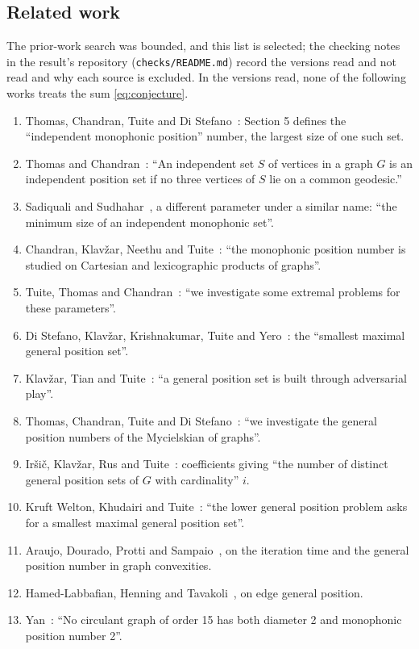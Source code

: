 \documentclass[11pt]{article}
\theoremstyle{remark}
\begin{document}
\begin{appendices}
\section{Related work}\label{app:prior}
The prior-work search was bounded, and this list is selected; the
checking notes in the result's repository (\texttt{checks/README.md})
record the versions read and not read and why each source is excluded.
In the versions read, none of the following works treats the sum
\eqref{eq:conjecture}.

\begin{enumerate}\setlength{\itemsep}{2pt}
\item Thomas, Chandran, Tuite and Di Stefano~\cite{monophonic}: Section 5
defines the ``independent monophonic position'' number, the largest size
of one such set.
\item Thomas and Chandran~\cite{independent}: ``An independent set $S$ of
vertices in a graph $G$ is an independent position set if no three
vertices of $S$ lie on a common geodesic.''
\item Sadiquali and Sudhahar~\cite{sadiquali}, a different parameter
under a similar name: ``the minimum size of an independent monophonic
set''.
\item Chandran, Klav\v{z}ar, Neethu and Tuite~\cite{products}: ``the
monophonic position number is studied on Cartesian and lexicographic
products of graphs''.
\item Tuite, Thomas and Chandran~\cite{extremal}: ``we investigate some
extremal problems for these parameters''.
\item Di Stefano, Klav\v{z}ar, Krishnakumar, Tuite and
Yero~\cite{lower}: the ``smallest maximal general position set''.
\item Klav\v{z}ar, Tian and Tuite~\cite{builder}: ``a general position
set is built through adversarial play''.
\item Thomas, Chandran, Tuite and Di Stefano~\cite{mycielski}: ``we
investigate the general position numbers of the Mycielskian of
graphs''.
\item Ir\v{s}i\v{c}, Klav\v{z}ar, Rus and Tuite~\cite{polynomials}:
coefficients giving ``the number of distinct general position sets of
$G$ with cardinality'' $i$.
\item Kruft Welton, Khudairi and Tuite~\cite{lowerproducts}: ``the lower
general position problem asks for a smallest maximal general position
set''.
\item Araujo, Dourado, Protti and Sampaio~\cite{convexities}, on the
iteration time and the general position number in graph convexities.
\item Hamed-Labbafian, Henning and Tavakoli~\cite{edge}, on edge general
position.
\item Yan~\cite{yan}: ``No circulant graph of order 15 has both diameter
2 and monophonic position number 2''.
\end{enumerate}
\end{appendices}
\end{document}
